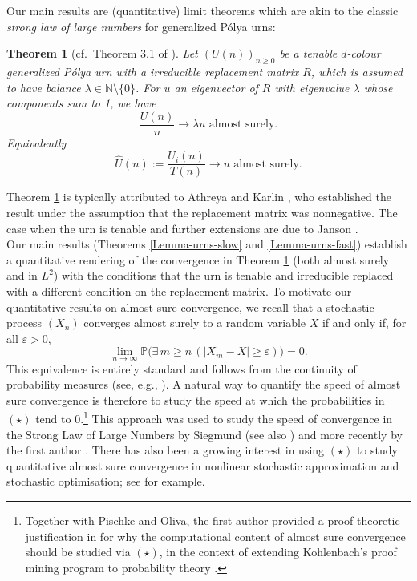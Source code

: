 \documentclass[12pt]{amsart}
\newtheorem{theorem}{Theorem}[section]
\theoremstyle{definition}
\theoremstyle{remark}
\newcommand{\NN}{\mathbb{N}}
\newcommand{\PP}{\mathbb{P}}
\begin{document}
Our main results are (quantitative) limit theorems which are akin to the classic \emph{strong law of large numbers} for generalized P\'olya urns:


\begin{theorem}[cf.\ Theorem 3.1 of \cite{janson2005asymptotic}]\label{urns-convergence}
    Let $(U(n))_{n\geq 0}$ be a tenable $d$-colour generalized P\'olya urn with a irreducible replacement matrix $R$, which is assumed to have balance $\lambda \in \NN\setminus\{0\}$. For $u$ an eigenvector of $R$ with eigenvalue $\lambda$ whose components sum to 1, we have
    \[
    \frac{U(n)}{n}\to \lambda u  \mbox{ almost surely.}
    \]
    Equivalently
     \[
    \hat{U}(n) := \frac{U_i(n)}{T(n)}\to u  \mbox{ almost surely.}
    \]
\end{theorem}
 Theorem \ref{urns-convergence} is typically attributed to Athreya and Karlin \cite{AthreyaKarlin1968}, who established the result under the assumption that the replacement matrix was nonnegative. The case when the urn is tenable and further extensions are due to Janson \cite{janson2004functional,janson2005asymptotic}.\\

 Our main results (Theorems \ref{Lemma-urns-slow} and \ref{Lemma-urns-fast}) establish a quantitative rendering of the convergence in Theorem \ref{urns-convergence} (both almost surely and in $L^2$) with the conditions that the urn is tenable and irreducible replaced with a different condition on the replacement matrix. To motivate our quantitative results on almost sure convergence, we recall that 
a stochastic process $(X_n)$ converges almost surely to a random variable $X$ 
if and only if, for all $\varepsilon > 0$,
\[
\lim_{n \to \infty} \PP\bigl(\exists\, m \geq n\, (|X_m - X| \geq \varepsilon)
\bigr) = 0. \tag{$\star$}
\]
This equivalence is entirely standard and follows from the continuity of 
probability measures (see, e.g., \cite[Lemma 3.1]{NeriPowell2024}). A natural way to quantify the speed of almost sure convergence is therefore to study the 
speed at which the probabilities in $(\star)$ tend to 0.\footnote{Together with Pischke and Oliva, the first author provided a proof-theoretic justification 
in \cite{NeriOlivaPischke2026} for why the computational content of almost sure 
convergence should be studied via $(\star)$, in the context of extending 
Kohlenbach's proof mining program \cite{Koh2008} to probability 
theory \cite{NeriPischke2024}.} This approach was used to study the speed of 
convergence in the Strong Law of Large Numbers by Siegmund \cite{siegmund1975large} 
(see also \cite{Fill:83:Largedev}) and more recently by the first 
author \cite{Neri2024,Neri2025}. There has also been a growing interest in 
using $(\star)$ to study quantitative almost sure convergence in nonlinear 
stochastic approximation and stochastic optimisation; 
see \cite{NeriPischkePowell2025b,NeriPischkePowell:fejer:rates,Pischke2025b,
Pischke2026,PischkePowell2024,PischkePowell2026} for example.\\
 
\end{document}
